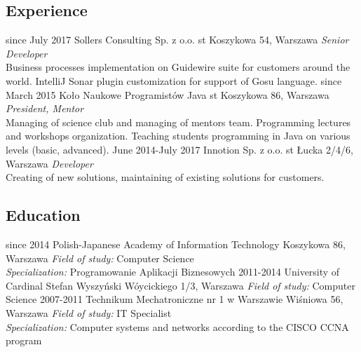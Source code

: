 \documentclass[]{friggeri-cv} %
\begin{document}
	\begin{absolutelynopagebreak}
		\section{Experience}
		\begin{entrylist}
			\entry
			{since July 2017}
			{Sollers Consulting Sp. z o.o.}
			{st Koszykowa 54, Warszawa}
			{\emph{Senior Developer}\\
				Business processes implementation on Guidewire suite for customers around the world. IntelliJ Sonar plugin customization for support of Gosu language.
			}
			\entry
			{since March 2015}
			{Koło Naukowe Programistów Java}
			{st Koszykowa 86, Warszawa}
			{\emph{President, Mentor}\\
				Managing of science club and managing of mentors team. Programming lectures and workshops organization. Teaching students programming in Java on various levels (basic, advanced).
			}
			\entry
			{June 2014-July 2017}
			{Innotion Sp. z o.o.}
			{st Łucka 2/4/6, Warszawa}
			{\emph{Developer}\\
				Creating of new solutions, maintaining of existing solutions for customers.
			}
		\end{entrylist}
	\end{absolutelynopagebreak}
	
	\begin{absolutelynopagebreak}
		\section{Education}
		\begin{entrylist}
			\entry
			{since 2014}
			{Polish-Japanese Academy of Information Technology}
			{Koszykowa 86, Warszawa}
			{\emph{Field of study:} Computer Science\\
			\emph{Specialization:} Programowanie Aplikacji Biznesowych}
			\entry
			{2011-2014}
			{University of Cardinal Stefan Wyszyński}
			{Wóycickiego 1/3, Warszawa}
			{\emph{Field of study:} Computer Science}
			\entry
			{2007-2011}
			{Technikum Mechatroniczne nr 1 w Warszawie}
			{Wiśniowa 56, Warszawa}
			{\emph{Field of study:} IT Specialist\\
			\emph{Specialization:} Computer systems and networks according to the CISCO CCNA program}
		\end{entrylist}
	\end{absolutelynopagebreak}
	
\end{document}
